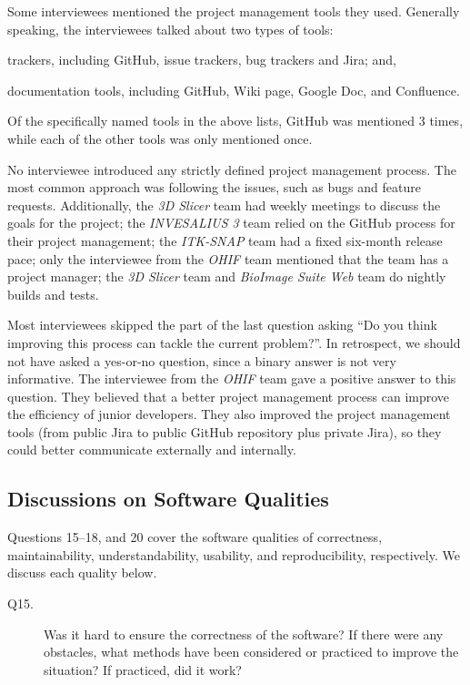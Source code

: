 \documentclass[final, 3p, times, authoryear]{elsarticle}
\begin{document}
Some interviewees mentioned the project management tools they used. Generally
speaking, the interviewees talked about two types of tools:
\begin{inparaenum}[i)]
\item trackers, including GitHub, issue trackers, bug trackers and Jira; and,
\item documentation tools, including GitHub, Wiki page, Google Doc, and Confluence.
\end{inparaenum}
Of the specifically named tools in the above lists, GitHub was mentioned 3
times, while each of the other tools was only mentioned once.

No interviewee introduced any strictly defined project management process. The
most common approach was following the issues, such as bugs and feature requests.
Additionally, the \textit{3D Slicer} team had weekly meetings to discuss the
goals for the project; the \textit{INVESALIUS 3} team relied on the GitHub
process for their project management; the \textit{ITK-SNAP} team had a fixed
six-month release pace; only the interviewee from the \textit{OHIF} team
mentioned that the team has a project manager; the \textit{3D Slicer} team and
\textit{BioImage Suite Web} team do nightly builds and tests.

Most interviewees skipped the part of the last question asking ``Do you think
improving this process can tackle the current problem?''. In retrospect, we
should not have asked a yes-or-no question, since a binary answer is not very
informative. The interviewee from the \textit{OHIF} team gave a positive answer
to this question. They believed that a better project management process can
improve the efficiency of junior developers. They also improved the project
management tools (from public Jira to public GitHub repository plus private
Jira), so they could better communicate externally and internally.

\subsection{Discussions on Software Qualities} \label{sec_interview_software_qualities}

Questions 15--18, and 20 cover the software qualities of correctness,
maintainability, understandability, usability, and reproducibility,
respectively. We discuss each quality below.

\begin{description}
\item[Q15.] Was it hard to ensure the correctness of the software? If there were
any obstacles, what methods have been considered or practiced to improve the
situation? If practiced, did it work?
\end{description}
\end{document}
